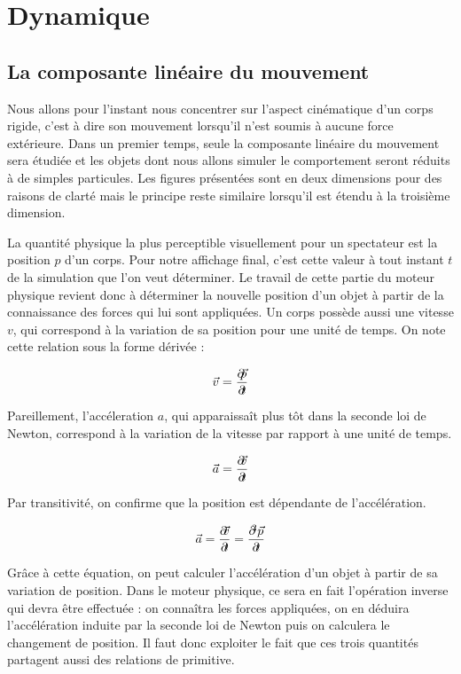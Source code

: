 \section{Dynamique} 

\subsection{La composante linéaire du mouvement}

Nous allons pour l'instant nous concentrer sur l'aspect cinématique d'un corps rigide, c'est à dire son mouvement lorsqu'il n'est soumis à aucune force extérieure. Dans un premier temps, seule la composante linéaire du mouvement sera étudiée et les objets dont nous allons simuler le comportement seront réduits à de simples particules. Les figures présentées sont en deux dimensions pour des raisons de clarté mais le principe reste similaire lorsqu'il est étendu à la troisième dimension.

La quantité physique la plus perceptible visuellement pour un spectateur est la position $p$ d'un corps. Pour notre affichage final, c'est cette valeur à tout instant $t$ de la simulation que l'on veut déterminer. Le travail de cette partie du moteur physique revient donc à déterminer la nouvelle position d'un objet à partir de la connaissance des forces qui lui sont appliquées. Un corps possède aussi une vitesse $v$, qui correspond à la variation de sa position pour une unité de temps. On note cette relation sous la forme dérivée :

\begin{align*}
  \vec{v} = \frac{\partial \!\! \vec{p}}{\partial \!\! t}
\end{align*}

Pareillement, l'accéleration $a$, qui apparaissaît plus tôt dans la seconde loi de Newton, correspond à la variation de la vitesse par rapport à une unité de temps.

\begin{align*}
  \vec{a} = \frac{\partial \!\! \vec{v}}{\partial \!\! t}
\end{align*}

Par transitivité, on confirme que la position est dépendante de l'accélération.

\begin{align*}
  \vec{a} = \frac{\deriv \vec{v}}{\deriv t} = \frac{\deriv^2 \vec{p}}{\deriv t}
\end{align*}

Grâce à cette équation, on peut calculer l'accélération d'un objet à partir de sa variation de position. Dans le moteur physique, ce sera en fait l'opération inverse qui devra être effectuée : on connaîtra les forces appliquées, on en déduira l'accélération induite par la seconde loi de Newton puis on calculera le changement de position. Il faut donc exploiter le fait que ces trois quantités partagent aussi des relations de primitive.

